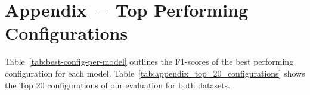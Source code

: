 \section{Appendix~--~Top Performing Configurations}\label{sec:appendix-d-top-performing-configs}


Table~\ref{tab:best-config-per-model} outlines the F1-scores of the best performing configuration for each model.
Table~\ref{tab:appendix_top_20_configurations} shows the Top 20 configurations of our evaluation for both datasets.

